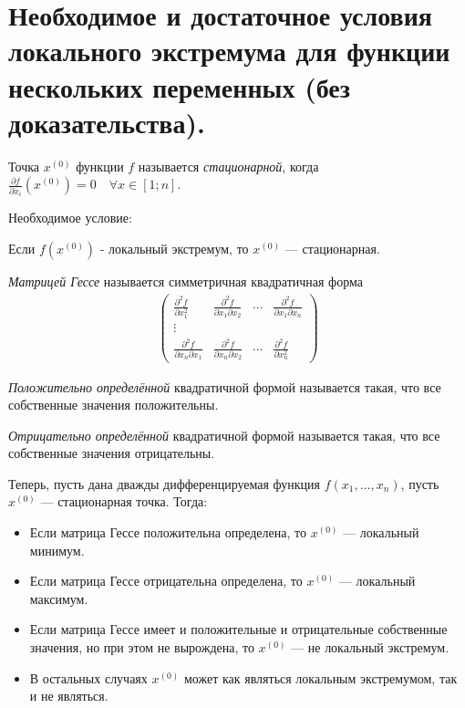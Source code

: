 \documentclass{article}
\begin{document}
\section{Необходимое и достаточное условия локального экстремума для функции нескольких переменных (без доказательства).}
\begin{definition}
	Точка $x^{(0)}$ функции $f$ называется \textit{стационарной}, когда $\frac{\partial f}{\partial x_i}(x^{(0)}) = 0 \quad\forall x \in [1;n]$.
\end{definition}
Необходимое условие:
\begin{theorem}
	Если $f(x^{(0)})$ - локальный экстремум, то $x^{(0)}$ --- стационарная.
\end{theorem}
\begin{definition}
    \textit{Матрицей Гессе} называется симметричная квадратичная форма
    \begin{gather*}
        \begin{pmatrix}
        \frac{\partial^2 f}{\partial x_1^2} & \frac{\partial^2 f}{\partial x_1 \partial x_2} & \cdots & \frac{\partial^2 f}{\partial x_1 \partial x_n}\\
        \vdots\\
        \frac{\partial^2 f}{\partial x_n \partial x_1} & \frac{\partial^2 f}{\partial x_n \partial x_2} & \cdots & \frac{\partial^2 f}{\partial x_n^2}
        \end{pmatrix}
    \end{gather*}
\end{definition}
\begin{definition}
    \textit{Положительно определённой} квадратичной формой называется такая, что все собственные значения положительны.
\end{definition}
\begin{definition}
    \textit{Отрицательно определённой} квадратичной формой называется такая, что все собственные значения отрицательны.
\end{definition}
\begin{theorem}
Теперь, пусть дана дважды дифференцируемая функция $f(x_1,\dotsc,x_n)$, пусть $x^{(0)}$ --- стационарная точка.
Тогда:
\begin{itemize}
    \item Если матрица Гессе положительна определена, то $x^{(0)}$ --- локальный минимум.
    \item Если матрица Гессе отрицательна определена, то $x^{(0)}$ --- локальный максимум.
    \item Если матрица Гессе имеет и положительные и отрицательные собственные значения, но при этом не вырождена, то $x^{(0)}$ --- не локальный экстремум.
    \item В остальных случаях $x^{(0)}$  может как являться локальным экстремумом, так и не являться.
\end{itemize}
\end{theorem}
\end{document}
